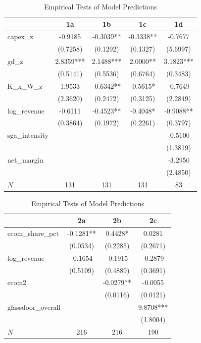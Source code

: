 \begin{table}[htbp]
\centering
\caption{Empirical Tests of Model Predictions}
\label{tab:empirical}
\small
\begin{tabular}{lcccc}
\toprule
& 1a & 1b & 1c & 1d \\
\midrule
capex\_z & -0.9185 & -0.3039** & -0.3338** & -0.7677 \\
 & (0.7258) & (0.1292) & (0.1327) & (5.6997) \\
gd\_z & 2.8359*** & 2.1488*** & 2.0000** & 3.1823*** \\
 & (0.5141) & (0.5536) & (0.6764) & (0.3483) \\
K\_x\_W\_z & 1.9533 & -0.6342** & -0.5615* & -0.7649 \\
 & (2.3620) & (0.2472) & (0.3125) & (2.2849) \\
log\_revenue & -0.6111 & -0.4523** & -0.4048* & -0.9088** \\
 & (0.3864) & (0.1972) & (0.2261) & (0.3797) \\
sga\_intensity &  &  &  & -0.5100 \\
 &  &  &  & (1.3819) \\
net\_margin &  &  &  & -3.2950 \\
 &  &  &  & (2.4850) \\
\midrule
$N$ & 131 & 131 & 131 & 83 \\
\bottomrule
\end{tabular}

\begin{tabular}{lccc}
\toprule
& 2a & 2b & 2c \\
\midrule
ecom\_share\_pct & -0.1281** & 0.4428* & 0.0281 \\
 & (0.0534) & (0.2285) & (0.2671) \\
log\_revenue & -0.1654 & -0.1915 & -0.2879 \\
 & (0.5109) & (0.4889) & (0.3691) \\
ecom2 &  & -0.0279** & -0.0055 \\
 &  & (0.0116) & (0.0121) \\
glassdoor\_overall &  &  & 9.8708*** \\
 &  &  & (1.8004) \\
\midrule
$N$ & 216 & 216 & 190 \\
\bottomrule
\end{tabular}


\end{table}
